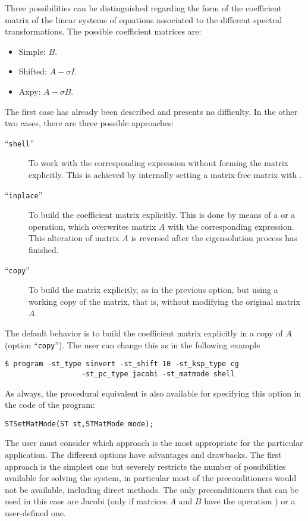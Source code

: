	Three possibilities can be distinguished regarding the form of the coefficient matrix of the linear systems of equations associated to the different spectral transformations. The possible coefficient matrices are:
	\begin{itemize}
	\item Simple: $B$.
	\item Shifted: $A-\sigma I$.
	\item Axpy: $A-\sigma B$.
	\end{itemize}
	The first case has already been described and presents no difficulty. In the other two cases, there are three possible approaches:
	\begin{description}
	\item[``\Verb!shell!''] To work with the corresponding expression without forming the matrix explicitly. This is achieved by internally setting a matrix-free matrix with .
	\item[``\Verb!inplace!''] To build the coefficient matrix explicitly. This is done by means of a  or a  operation, which overwrites matrix $A$ with the corresponding expression. This alteration of matrix $A$ is reversed after the eigensolution process has finished.
	\item[``\Verb!copy!''] To build the matrix explicitly, as in the previous option, but using a working copy of the matrix, that is, without modifying the original matrix $A$. 
	\end{description}
	The default behavior is to build the coefficient matrix explicitly in a copy of $A$ (option ``\Verb!copy!''). The user can change this as in the following example
\begin{Verbatim}[fontsize=\small]
	$ program -st_type sinvert -st_shift 10 -st_ksp_type cg
                  -st_pc_type jacobi -st_matmode shell
\end{Verbatim}
	As always, the procedural equivalent is also available for specifying this option in the code of the program:
	\begin{Verbatim}[fontsize=\small]
	STSetMatMode(ST st,STMatMode mode);
	\end{Verbatim}

	The user must consider which approach is the most appropriate for the particular application. The different options have advantages and drawbacks. The first approach is the simplest one but severely restricts the number of possibilities available for solving the system, in particular most of the \petsc{} preconditioners would not be available, including direct methods. The only preconditioners that can be used in this case are Jacobi (only if matrices $A$ and $B$ have the operation ) or a user-defined one.
	
